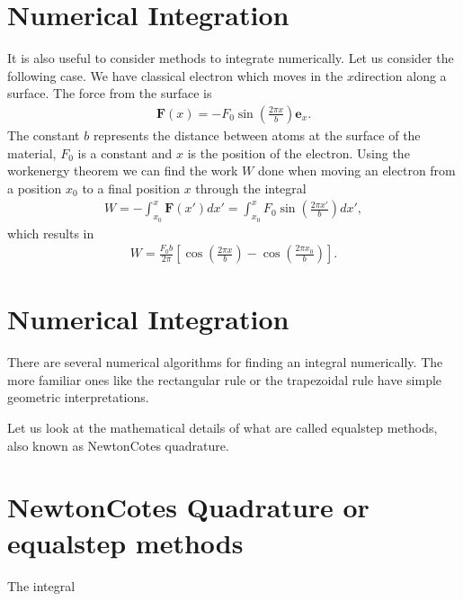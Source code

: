 \documentclass[letterpaper,10pt,english]{sphinxmanual}
\begin{document}
\section{Numerical Integration}
\label{\detokenize{chapter1:numerical-integration}}
It is also useful to consider methods to integrate numerically.
Let us consider the following case.
We have  classical electron which moves in the \(x\)\sphinxhyphen{}direction along a surface. The force from the surface is
\begin{equation*}
\begin{split}
\boldsymbol{F}(x)=-F_0\sin{(\frac{2\pi x}{b})}\boldsymbol{e}_x.
\end{split}
\end{equation*}
The constant \(b\) represents the distance between atoms at the surface of the material, \(F_0\) is a constant and \(x\) is the position of the electron.
Using the work\sphinxhyphen{}energy theorem we can find the work \(W\) done when moving an electron from a position \(x_0\) to a final position \(x\) through the
integral
\begin{equation*}
\begin{split}
W=-\int_{x_0}^x \boldsymbol{F}(x')dx' =  \int_{x_0}^x F_0\sin{(\frac{2\pi x'}{b})} dx',
\end{split}
\end{equation*}
which results in
\begin{equation*}
\begin{split}
W=\frac{F_0b}{2\pi}\left[\cos{(\frac{2\pi x}{b})}-\cos{(\frac{2\pi x_0}{b})}\right].
\end{split}
\end{equation*}

\section{Numerical Integration}
\label{\detokenize{chapter1:id2}}
There are several numerical algorithms for finding an integral
numerically. The more familiar ones like the rectangular rule or the
trapezoidal rule have simple geometric interpretations.

Let us look at the mathematical details of what are called equal\sphinxhyphen{}step methods, also known as Newton\sphinxhyphen{}Cotes quadrature.


\section{Newton\sphinxhyphen{}Cotes Quadrature or equal\sphinxhyphen{}step methods}
\label{\detokenize{chapter1:newton-cotes-quadrature-or-equal-step-methods}}
The integral
\end{document}
